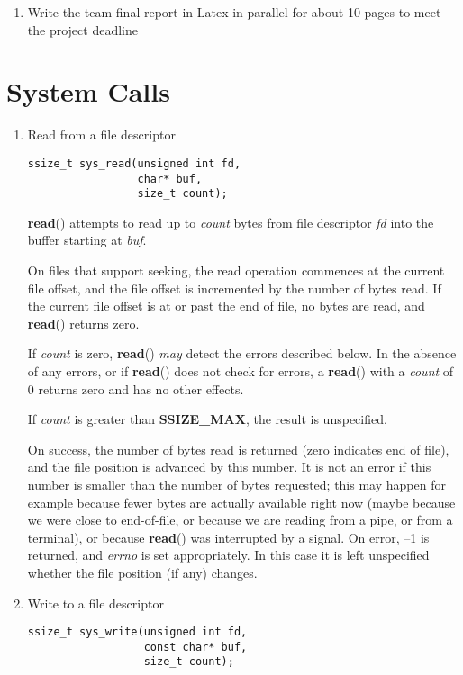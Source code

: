 \documentclass[twoside]{article}
\begin{document}
\begin{multicols}{2}
\begin{enumerate}
\item Write the team final report in Latex in parallel for about 10 pages to meet the project deadline
\end{enumerate}


\section{System Calls}

\begin{enumerate}

\item
Read from a file descriptor
{\footnotesize
\begin{lstlisting}
ssize_t sys_read(unsigned int fd, 
                 char* buf, 
                 size_t count);
\end{lstlisting}
\par}

{\bf read}{\rm ()}
attempts to read up to
{\it count}
bytes from file descriptor
{\it fd}
into the buffer starting at
{\it buf}{\rm .}

On files that support seeking,
the read operation commences at the current file offset,
and the file offset is incremented by the number of bytes read.
If the current file offset is at or past the end of file,
no bytes are read, and
{\bf read}{\rm ()}
returns zero.

If
{\it count}
is zero,
{\bf read}{\rm ()}
{\it may}
detect the errors described below.
In the absence of any errors,
or if
{\bf read}{\rm ()}
does not check for errors, a
{\bf read}{\rm ()}
with a
{\it count}
of 0 returns zero and has no other effects.

If
{\it count}
is greater than
{\bf SSIZE\_MAX}{\rm ,}
the result is unspecified.

On success, the number of bytes read is returned (zero indicates end of
file), and the file position is advanced by this number.
It is not an error if this number is smaller than the number of bytes
requested; this may happen for example because fewer bytes are actually
available right now (maybe because we were close to end-of-file, or
because we are reading from a pipe, or from a terminal), or because
{\bf read}{\rm ()}
was interrupted by a signal.
On error, --1 is returned, and
{\it errno}
is set appropriately.
In this case it is left unspecified whether
the file position (if any) changes.


\item
Write to a file descriptor
{\footnotesize
\begin{lstlisting}
ssize_t sys_write(unsigned int fd,
                  const char* buf,
                  size_t count);
\end{lstlisting}
\par}


\end{enumerate}
\end{multicols}
\end{document}
